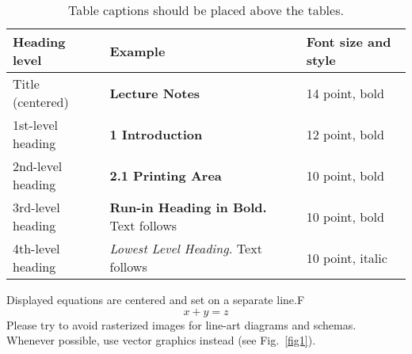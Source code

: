 \documentclass[runningheads]{llncs}
\begin{document}
        \begin{table}
        \caption{Table captions should be placed above the tables.}\label{tab1}
        \begin{tabular}{|l|l|l|}
        \hline
        Heading level &  Example & Font size and style\\
        \hline
        Title (centered) &  {\Large\bfseries Lecture Notes} & 14 point, bold\\
        1st-level heading &  {\large\bfseries 1 Introduction} & 12 point, bold\\
        2nd-level heading & {\bfseries 2.1 Printing Area} & 10 point, bold\\
        3rd-level heading & {\bfseries Run-in Heading in Bold.} Text follows &
        10 point, bold\\
        4th-level heading & {\itshape Lowest Level Heading.} Text follows & 10
        point, italic\\
        \hline
        \end{tabular}
        \end{table}


        \noindent Displayed equations are centered and set on a separate line.F
        \begin{equation}
        x + y = z
        \end{equation}
        Please try to avoid rasterized images for line-art diagrams and schemas.
        Whenever possible, use vector graphics instead (see Fig.~\ref{fig1}).

\end{document}
